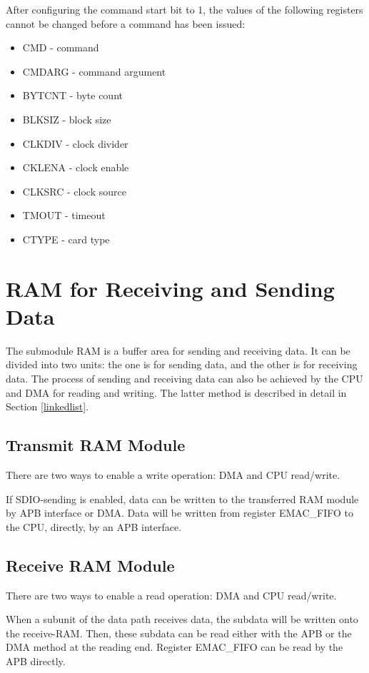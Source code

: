 \documentclass[main\_\_EN.tex]{subfiles}
\begin{document}
After configuring the command start bit to 1, the values of the following registers cannot be changed before a command has been issued:

\begin{itemize}
	\item CMD -     command
	\item CMDARG -  command argument
	\item BYTCNT -  byte count
	\item BLKSIZ -  block size
	\item CLKDIV -  clock divider
	\item CKLENA -  clock enable
	\item CLKSRC -  clock source
	\item TMOUT -   timeout
	\item CTYPE -   card type
\end{itemize}

\section{RAM for Receiving and Sending Data}

The submodule RAM is a buffer area for sending and receiving data. It can be divided into two units: the one is for sending data, and the other is for receiving data. The process of sending and receiving data can also be achieved by the CPU and DMA for reading and writing. The latter method is described in detail in Section \ref{linkedlist}.

\subsection{Transmit RAM Module}
There are two ways to enable a write operation: DMA and CPU read/write.

If SDIO-sending is enabled, data can be written to the transferred RAM module by APB interface or DMA. Data will be written from register EMAC\_FIFO to the CPU, directly, by an APB interface.

\subsection{Receive RAM Module}

There are two ways to enable a read operation: DMA and CPU read/write.

When a subunit of the data path receives data, the subdata will be written onto the receive-RAM. Then, these subdata can be read either with the APB or the DMA method at the reading end. Register EMAC\_FIFO can be read by the APB directly.
\end{document}
